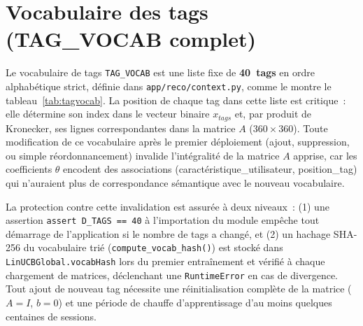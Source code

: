 
\section{Vocabulaire des tags (TAG\_VOCAB complet)}
\label{ann:tagvocab}

Le vocabulaire de tags \texttt{TAG\_VOCAB} est une liste fixe de \textbf{40~tags} en ordre
alphabétique strict, définie dans \texttt{app/reco/context.py}, comme le montre le tableau~\ref{tab:tagvocab}. La position de chaque tag
dans cette liste est critique~: elle détermine son index dans le vecteur binaire $x_{tags}$
et, par produit de Kronecker, ses lignes correspondantes dans la matrice $A$ ($360 \times 360$).
Toute modification de ce vocabulaire après le premier déploiement (ajout, suppression, ou
simple réordonnancement) invalide l'intégralité de la matrice $A$ apprise, car les
coefficients $\theta$ encodent des associations (caractéristique\_utilisateur, position\_tag)
qui n'auraient plus de correspondance sémantique avec le nouveau vocabulaire.

La protection contre cette invalidation est assurée à deux niveaux~: (1) une assertion
\texttt{assert D\_TAGS == 40} à l'importation du module empêche tout démarrage de
l'application si le nombre de tags a changé, et (2) un hachage SHA-256 du vocabulaire
trié (\texttt{compute\_vocab\_hash()}) est stocké dans \texttt{LinUCBGlobal.vocabHash} lors
du premier entraînement et vérifié à chaque chargement de matrices, déclenchant une
\texttt{RuntimeError} en cas de divergence. Tout ajout de nouveau tag nécessite une
réinitialisation complète de la matrice ($A = I$, $b = 0$) et une période de chauffe
d'apprentissage d'au moins quelques centaines de sessions.

